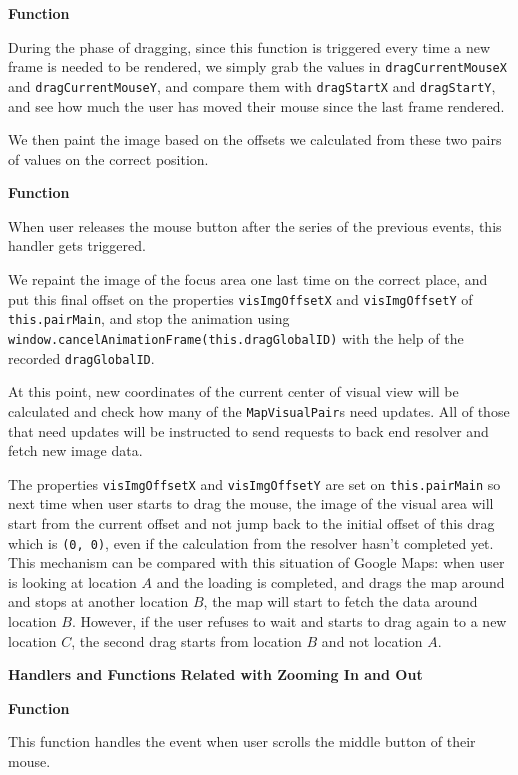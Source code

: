 \textbf{Function} 

During the phase of dragging, since this function is triggered every time a new frame is needed to be rendered, we simply grab the values in \texttt{dragCurrentMouseX} and \texttt{dragCurrentMouseY}, and compare them with \texttt{dragStartX} and \texttt{dragStartY}, and see how much the user has moved their mouse since the last frame rendered.

We then paint the image based on the offsets we calculated from these two pairs of values on the correct position.

\textbf{Function} 

When user releases the mouse button after the series of the previous events, this handler gets triggered.

We repaint the image of the focus area one last time on the correct place, and put this final offset on the properties \texttt{visImgOffsetX} and \texttt{visImgOffsetY} of \texttt{this.pairMain}, and stop the animation using \texttt{window.cancelAnimationFrame(this.dragGlobalID)} with the help of the recorded \texttt{dragGlobalID}.

At this point, new coordinates of the current center of visual view will be calculated and check how many of the \texttt{MapVisualPair}s need updates. All of those that need updates will be instructed to send requests to back end resolver and fetch new image data.

The properties \texttt{visImgOffsetX} and \texttt{visImgOffsetY} are set on \texttt{this.pairMain} so next time when user starts to drag the mouse, the image of the visual area will start from the current offset and not jump back to the initial offset of this drag which is \texttt{(0, 0)}, even if the calculation from the resolver hasn't completed yet. This mechanism can be compared with this situation of Google Maps: when user is looking at location $A$ and the loading is completed, and drags the map around and stops at another location $B$, the map will start to fetch the data around location $B$. However, if the user refuses to wait and starts to drag again to a new location $C$, the second drag starts from location $B$ and not location $A$.

\textbf{Handlers and Functions Related with Zooming In and Out}

\textbf{Function} 

This function handles the event when user scrolls the middle button of their mouse.

